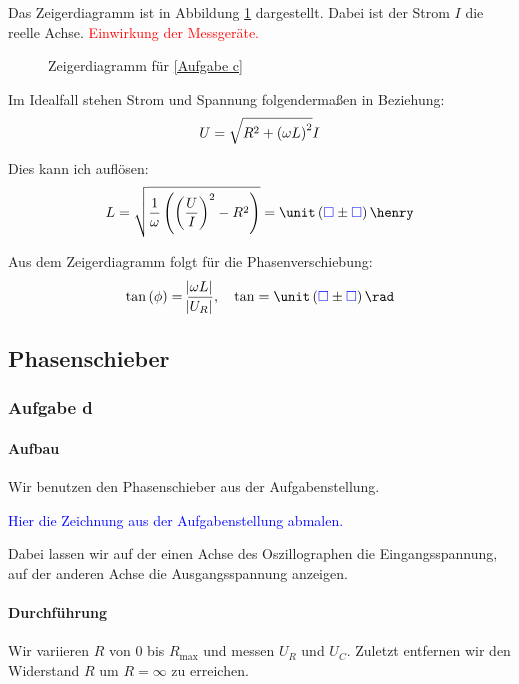 \documentclass[11pt, ngerman]{article}
\newcommand{\emesswert}{\left(\messwert \pm \messwert \right)}
\newcommand{\messwert}{\textcolor{blue}{\square}}
\begin{document}
Das Zeigerdiagramm ist in Abbildung \ref{fig:Aufgabe c} dargestellt. Dabei ist
der Strom $I$ die reelle Achse. \textcolor{red}{Einwirkung der Messgeräte.}

\begin{figure}[h!]
	\centering
	\caption{Zeigerdiagramm für \ref{Aufgabe c}}
	\label{fig:Aufgabe c}
\end{figure}

Im Idealfall stehen Strom und Spannung folgendermaßen in Beziehung:
\[ U = \sqrt{R^2 + \del{\omega L}^2} I \]

Dies kann ich auflösen:
\[
L = \sqrt{\frac 1\omega \del{\del{\frac UI}^2 - R^2}}
= \unit \emesswert \henry
\]

Aus dem Zeigerdiagramm folgt für die Phasenverschiebung:
\[
	\tan\del\phi = \frac{\abs{\omega L}}{\abs{U_R}}
	, \quad
	\tan = \unit \emesswert \rad
\]

\subsection{Phasenschieber}

\subsubsection{Aufgabe d}

\paragraph{Aufbau}

Wir benutzen den Phasenschieber aus der Aufgabenstellung.

\textcolor{blue}{Hier die Zeichnung aus der Aufgabenstellung abmalen.}

Dabei lassen wir auf der einen Achse des Oszillographen die Eingangsspannung,
auf der anderen Achse die Ausgangsspannung anzeigen.

\paragraph{Durchführung}

Wir variieren $R$ von $0$ bis $R_\text{max}$ und messen $U_R$ und $U_C$.
Zuletzt entfernen wir den Widerstand $R$ um $R = \infty$ zu erreichen.
\end{document}
